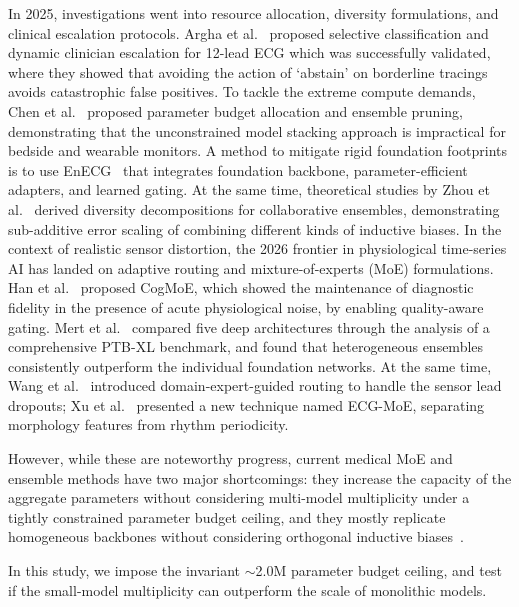 \documentclass{ICIC2026}
\begin{document}
In 2025, investigations went into resource allocation, diversity formulations, and clinical escalation protocols. Argha et al.~\cite{argha2025selective} proposed selective classification and dynamic clinician escalation for 12-lead ECG which was successfully validated, where they showed that avoiding the action of `abstain' on borderline tracings avoids catastrophic false positives. To tackle the extreme compute demands, Chen et al.~\cite{chen2025budget} proposed parameter budget allocation and ensemble pruning, demonstrating that the unconstrained model stacking approach is impractical for bedside and wearable monitors. A method to mitigate rigid foundation footprints is to use EnECG~\cite{xu2025enecg} that integrates foundation backbone, parameter-efficient adapters, and learned gating. At the same time, theoretical studies by Zhou et al.~\cite{zhou2025diversity} derived diversity decompositions for collaborative ensembles, demonstrating sub-additive error scaling of combining different kinds of inductive biases. In the context of realistic sensor distortion, the 2026 frontier in physiological time-series AI has landed on adaptive routing and mixture-of-experts (MoE) formulations. Han et al.~\cite{han2026cogmoe} proposed CogMoE, which showed the maintenance of diagnostic fidelity in the presence of acute physiological noise, by enabling quality-aware gating. Mert et al.~\cite{mert2026multilabel} compared five deep architectures through the analysis of a comprehensive PTB-XL benchmark, and found that heterogeneous ensembles consistently outperform the individual foundation networks. At the same time, Wang et al.~\cite{wang2026domain} introduced domain-expert-guided routing to handle the sensor lead dropouts; Xu et al.~\cite{xu2026ecgmoe} presented a new technique named ECG-MoE, separating morphology features from rhythm periodicity.

However, while these are noteworthy progress, current medical MoE and ensemble methods have two major shortcomings: they increase the capacity of the aggregate parameters without considering multi-model multiplicity under a tightly constrained parameter budget ceiling, and they mostly replicate homogeneous backbones without considering orthogonal inductive biases~\cite{zhou2025diversity}.

In this study, we impose the invariant $\sim$2.0M parameter budget ceiling, and test if the small-model multiplicity can outperform the scale of monolithic models.
\end{document}
